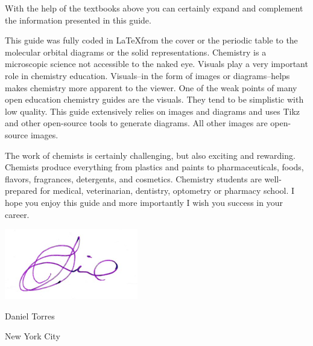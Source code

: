 \documentclass[main.tex]{subfiles}
\begin{document}
\begin{fullwidth}
\begin{multicols*}{2}
With the help of the textbooks above you can certainly expand and complement the information presented in this guide.

This guide was fully coded in \LaTeX from the cover or the periodic table to the molecular orbital diagrams or the solid representations. Chemistry is a microscopic science not accessible to the naked eye. Visuals play a very important role in chemistry education. Visuals--in the form of images or diagrams--helps makes chemistry more apparent to the viewer. One of the weak points of many open education chemistry guides are the visuals. They tend to be simplistic with low quality. This guide extensively relies on images and diagrams and uses Tikz and other open-source tools to generate diagrams. All other images are open-source images.

The work of chemists is certainly challenging, but also exciting and rewarding. Chemists produce everything from plastics and paints to pharmaceuticals, foods, flavors, fragrances, detergents, and cosmetics. Chemistry students are well-prepared for medical, veterinarian, dentistry, optometry or pharmacy school. I hope you enjoy this guide and more importantly I wish you success in your career.  
\par \medskip
\includegraphics[height=4.5\baselineskip,]{./tothereader/signature} \par
Daniel Torres \par
New York City
\end{multicols*}
\end{fullwidth}
\restoregeometry
\end{document}

